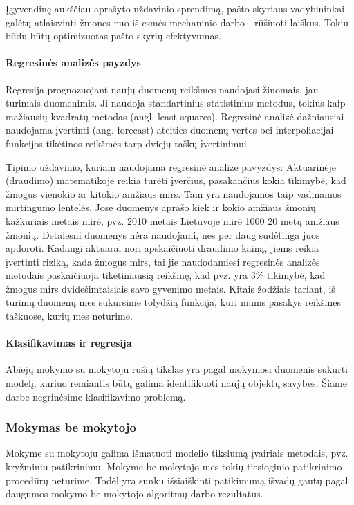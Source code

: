 Įgyvendinę aukščiau aprašyto uždavinio sprendimą, pašto skyriaus vadybininkai
galėtų atlaisvinti žmones nuo iš esmės mechaninio darbo - rūšiuoti laiškus.
Tokiu būdu būtų optimizuotas pašto skyrių efektyvumas.

\paragraph{Regresinės analizės payzdys}

Regresija prognozuojant naujų duomenų reikšmes naudojasi žinomais, jau turimais
duomenimis. Ji naudoja standartinius statistinius metodus, tokius kaip mažiausių
kvadratų metodas (angl. least squares). Regresinė analizė dažniausiai naudojama
įvertinti (ang. forecast) ateities duomenų vertes bei interpoliacijai -
funkcijos tikėtinos reikšmės tarp dviejų taškų įvertinimui.

Tipinio uždavinio, kuriam naudojama regresinė analizė pavyzdys: Aktuarinėje
(draudimo) matematikoje reikia turėti įverčius, pasakančius kokia tikimybė, kad
žmogus vienokio ar kitokio amžiaus mirs. Tam yra naudojamos taip vadinamos 
mirtingumo lentelės. Jose duomenys aprašo kiek ir kokio amžiaus žmonių
kažkuriais metais mirė, pvz. 2010 metais Lietuvoje mirė 1000 20 metų amžiaus 
žmonių. Detalesni duomenys nėra naudojami, nes per daug sudėtinga juos apdoroti.
Kadangi aktuarai nori apskaičiuoti draudimo kainą, jiems reikia įvertinti
riziką, kada žmogus mirs, tai jie naudodamiesi regresinės analizės metodais 
paskaičiuoja tikėtiniausią reikšmę, kad pvz. yra 3\% tikimybė, kad žmogus  mirs
dvidešimtaisiais savo gyvenimo metais. Kitais žodžiais tariant, iš turimų
duomenų mes sukursime tolydžią funkcija, kuri mums pasakys reikšmes taškuose,
kurių mes neturime.

\paragraph{Klasifikavimas ir regresija}

Abiejų mokymo su mokytoju rūšių tikslas yra pagal mokymosi duomenis sukurti
modelį, kuriuo remiantis būtų galima identifikuoti naujų objektų
savybes.\cite{markhall99} Šiame darbe negrinėsime klasifikavimo problemą.

\subsubsection{Mokymas be mokytojo}

Mokyme su mokytoju galima išmatuoti modelio tikslumą įvairiais metodais, pvz.
kryžminiu patikrinimu. Mokyme be mokytojo mes tokių tiesioginio patikrinimo
procedūrų neturime. Todėl yra sunku išsiaiškinti patikimumą išvadų gautų pagal
daugumos mokymo be mokytojo algoritmų darbo rezultatus. 


